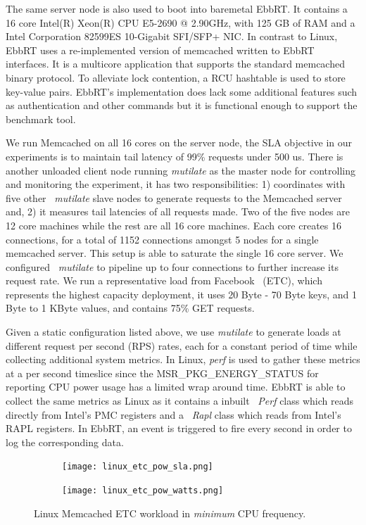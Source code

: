 \documentclass[letterpaper,twocolumn,10pt]{article}
\begin{document}
The same server node is also used to boot into baremetal EbbRT. It contains a 16 core Intel(R) Xeon(R) CPU E5-2690 @ 2.90GHz, with 125 GB of RAM and a Intel Corporation 82599ES 10-Gigabit SFI/SFP+ NIC. In contrast to Linux, EbbRT uses a re-implemented version of memcached written to EbbRT interfaces. It is a multicore application that supports the standard memcached binary protocol. To alleviate lock contention, a RCU hashtable is used to store key-value pairs. EbbRT's implementation does lack some additional features such as authentication and other commands but it is functional enough to support the benchmark tool. 

We run Memcached on all 16 cores on the server node, the SLA objective in our experiments is to maintain tail latency of 99\% requests under 500 us. There is another unloaded client node running \textit{mutilate} as the master node for controlling and monitoring the experiment, it has two responsibilities: 1) coordinates with five other ~\textit{mutilate} slave nodes to generate requests to the Memcached server and, 2) it measures tail latencies of all requests made. Two of the five nodes are 12 core machines while the rest are all 16 core machines. Each core creates 16 connections, for a total of 1152 connections amongst 5 nodes for a single memcached server. This setup is able to saturate the single 16 core server. We configured ~\textit{mutilate} to pipeline up to four connections to further increase its request rate. We run a representative load from Facebook~\cite{workloadanalysisfacebook} (ETC), which represents the highest capacity deployment, it uses 20 Byte - 70 Byte keys, and 1 Byte to 1 KByte values, and contains 75\% GET requests.

Given a static configuration listed above, we use \textit{mutilate} to generate loads at different request per second (RPS) rates, each for a constant period of time while collecting additional system metrics. In Linux, \textit{perf} is used to gather these metrics at a per second timeslice since the MSR\_PKG\_ENERGY\_STATUS for reporting CPU power usage has a limited wrap around time. EbbRT is able to collect the same metrics as Linux as it contains a inbuilt ~\textit{Perf} class which reads directly from Intel's PMC registers and a ~\textit{Rapl} class which reads from Intel's RAPL registers. In EbbRT, an event is triggered to fire every second in order to log the corresponding data.
\begin{figure}
 \begin{subfigure}[b]{0.48\textwidth}
   \texttt{[image: linux\_etc\_pow\_sla.png]}
   \caption{}
   \label{fig:linux_etc_pow:sla}
    \end{subfigure}

\begin{subfigure}[b]{0.48\textwidth}
   \texttt{[image: linux\_etc\_pow\_watts.png]}
   \caption{}
   \label{fig:linux_etc_pow:watts}
  \end{subfigure}
  \caption{Linux Memcached ETC workload in \textit{minimum} CPU frequency.}
  \label{fig:linux_etc_pow:main}
\end{figure}
\end{document}
